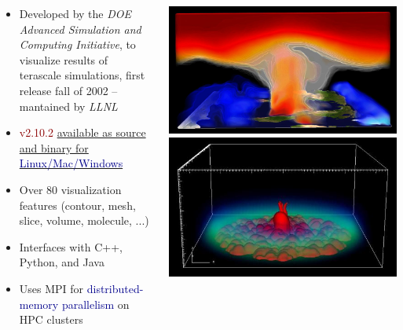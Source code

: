 \begin{frame}
\begin{columns}
\begin{column}{7.65cm}
\begin{small}
\begin{itemize}
        \item Developed by the \textit{DOE Advanced Simulation and Computing Initiative}, %
 to visualize results of terascale simulations, first release fall of 2002 -- mantained by \textit{LLNL}
        \item \textcolor{DarkRed}{v2.10.2} \href{https://wci.llnl.gov/simulation/computer-codes/visit/downloads}{available as source and binary for \textcolor{DarkBlue}{Linux/Mac/Windows}}
        \item Over 80 visualization features (contour, mesh, slice, volume, molecule, ...)
        \item Interfaces with C++, Python, and Java
        \item Uses MPI for \textcolor{DarkBlue}{distributed-memory parallelism} on HPC clusters
\end{itemize}
\end{small}
\end{column}
\begin{column}{5cm}
	\vspace{-2mm}

        \href{https://wci.llnl.gov/simulation/computer-codes/visit/gallery}{\includegraphics[width=.475\columnwidth]{figs/visit-exs/VisIt-gallery_33}}
        \href{https://wci.llnl.gov/simulation/computer-codes/visit/gallery}{\includegraphics[width=.475\columnwidth]{figs/visit-exs/VisIt-gallery_10}}


\end{column}
\end{columns}
\end{frame}

